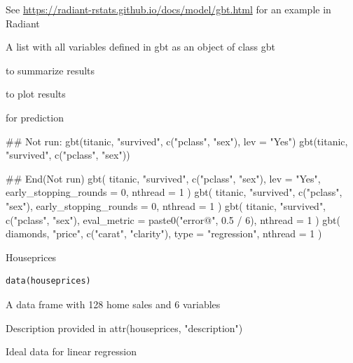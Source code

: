 \documentclass[a4paper]{book}
\begin{document}
%
\begin{Details}
See \url{https://radiant-rstats.github.io/docs/model/gbt.html} for an example in Radiant
\end{Details}
%
\begin{Value}
A list with all variables defined in gbt as an object of class gbt
\end{Value}
%
\begin{SeeAlso}
 to summarize results

 to plot results

 for prediction
\end{SeeAlso}
%
\begin{Examples}
\begin{ExampleCode}
## Not run: 
gbt(titanic, "survived", c("pclass", "sex"), lev = "Yes") %
gbt(titanic, "survived", c("pclass", "sex")) %

## End(Not run)
gbt(
  titanic, "survived", c("pclass", "sex"), lev = "Yes",
  early_stopping_rounds = 0, nthread = 1
) %
gbt(
  titanic, "survived", c("pclass", "sex"),
  early_stopping_rounds = 0, nthread = 1
) %
gbt(
  titanic, "survived", c("pclass", "sex"),
  eval_metric = paste0("error@", 0.5 / 6), nthread = 1
) %
gbt(
  diamonds, "price", c("carat", "clarity"), type = "regression", nthread = 1
) %

\end{ExampleCode}
\end{Examples}
%
\begin{Description}
Houseprices
\end{Description}
%
\begin{Usage}
\begin{verbatim}
data(houseprices)
\end{verbatim}
\end{Usage}
%
\begin{Format}
A data frame with 128 home sales and 6 variables
\end{Format}
%
\begin{Details}
Description provided in attr(houseprices, "description")
\end{Details}
%
\begin{Description}
Ideal data for linear regression
\end{Description}
\end{document}
